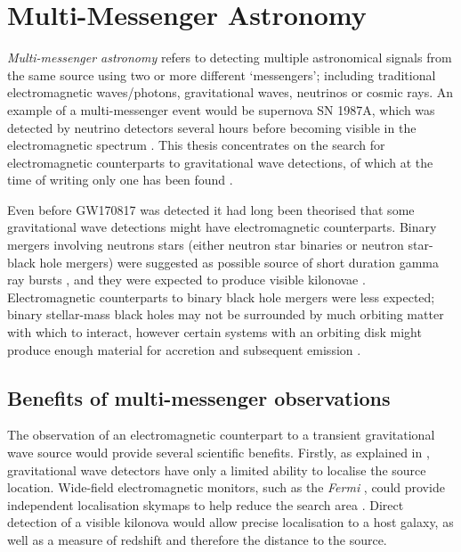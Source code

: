 \section{Multi-Messenger Astronomy}
\label{sec:multi}
\begin{colsection}


\begin{colsection}

\emph{Multi-messenger astronomy} refers to detecting multiple astronomical signals from the same source using two or more different `messengers'; including traditional electromagnetic waves/photons, gravitational waves, neutrinos or cosmic rays. An example of a multi-messenger event would be supernova SN 1987A, which was detected by neutrino detectors several hours before becoming visible in the electromagnetic spectrum \citep{SN1987A}. This thesis concentrates on the search for electromagnetic counterparts to gravitational wave detections, of which at the time of writing only one has been found \citep[GW170817;][]{GW170817}.

Even before GW170817 was detected it had long been theorised that some gravitational wave detections might have electromagnetic counterparts. Binary mergers involving neutrons stars (either neutron star binaries or neutron star-black hole mergers) were suggested as possible source of short duration gamma ray bursts \citep{SGRBs}, and they were expected to produce visible kilonovae \citep{BNSNSBH_EM, BNS_EM}. Electromagnetic counterparts to binary black hole mergers were less expected; binary stellar-mass black holes may not be surrounded by much orbiting matter with which to interact, however certain systems with an orbiting disk might produce enough material for accretion and subsequent emission \citep{BBH_EM}.

\end{colsection}


\subsection{Benefits of multi-messenger observations}
\label{sec:mma_benefits}
\begin{colsection}

The observation of an electromagnetic counterpart to a transient gravitational wave source would provide several scientific benefits. Firstly, as explained in , gravitational wave detectors have only a limited ability to localise the source location. Wide-field electromagnetic monitors, such as the \textit{Fermi} , could provide independent localisation skymaps to help reduce the search area \citep[note the \textit{Fermi} skymap included in ]{GW170817_GRB}. Direct detection of a visible kilonova would allow precise localisation to a host galaxy, as well as a measure of redshift and therefore the distance to the source.


\end{colsection}
\end{colsection}
